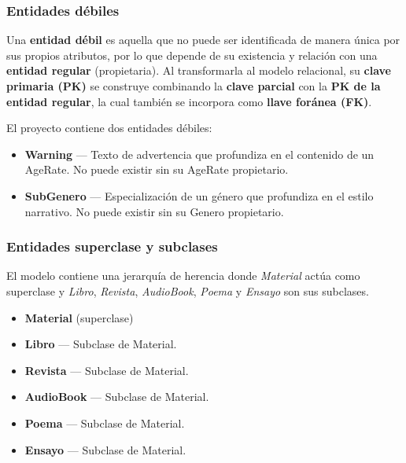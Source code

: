 \documentclass[12pt,a4paper]{article}
\begin{document}
\subsubsection{Entidades débiles}

Una \textbf{entidad débil} es aquella que no puede ser identificada de manera única por sus propios atributos, por lo que depende de su existencia y relación con una \textbf{entidad regular} (propietaria). Al transformarla al modelo relacional, su \textbf{clave primaria (PK)} se construye combinando la \textbf{clave parcial} con la \textbf{PK de la entidad regular}, la cual también se incorpora como \textbf{llave foránea (FK)}.


El proyecto contiene dos entidades débiles:

\begin{itemize}

    \item \textbf{Warning} — Texto de advertencia que profundiza en el contenido de
    un AgeRate. No puede existir sin su AgeRate propietario.

    \item \textbf{SubGenero} — Especialización de un género que profundiza en el
    estilo narrativo. No puede existir sin su Genero propietario.

\end{itemize}

\subsubsection{Entidades superclase y subclases}
El modelo contiene una jerarquía de herencia donde \textit{Material} actúa
como superclase y \textit{Libro}, \textit{Revista}, \textit{AudioBook},
\textit{Poema} y \textit{Ensayo} son sus subclases.

\begin{itemize}

    \item \textbf{Material} (superclase)
    \item \textbf{Libro} — Subclase de Material.
    \item \textbf{Revista} — Subclase de Material.
    \item \textbf{AudioBook} — Subclase de Material.
    \item \textbf{Poema} — Subclase de Material.
    \item \textbf{Ensayo} — Subclase de Material.

\end{itemize}
\end{document}
